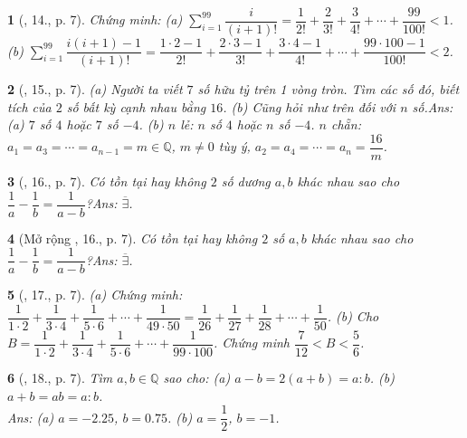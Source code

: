 \documentclass{article}
\newtheorem{baitoan}{}
\begin{document}
\begin{baitoan}[\cite{Binh_Toan_7_tap_1}, 14., p. 7]
	Chứng minh: (a) $\sum_{i=1}^{99} \dfrac{i}{(i+1)!} = \dfrac{1}{2!} + \dfrac{2}{3!} + \dfrac{3}{4!} + \cdots + \dfrac{99}{100!} < 1$. (b) $\sum_{i=1}^{99} \dfrac{i(i + 1) - 1}{(i+1)!} = \dfrac{1\cdot 2 - 1}{2!} + \dfrac{2\cdot 3 - 1}{3!} + \dfrac{3\cdot 4 - 1}{4!} + \cdots + \dfrac{99\cdot 100 - 1}{100!} < 2$.	
\end{baitoan}

\begin{baitoan}[\cite{Binh_Toan_7_tap_1}, 15., p. 7]
	(a) Người ta viết $7$ số hữu tỷ trên 1 vòng tròn. Tìm các số đó, biết tích của $2$ số bất kỳ cạnh nhau bằng $16$. (b) Cũng hỏi như trên đối với $n$ số.\hfill{\sf Ans: (a) $7$ số $4$ hoặc $7$ số $-4$. (b) $n$ lẻ: $n$ số $4$ hoặc $n$ số $-4$. $n$ chẵn: $a_1 = a_3 = \cdots = a_{n-1} = m\in\mathbb{Q}$, $m\ne 0$ tùy ý, $a_2 = a_4 = \cdots = a_n = \dfrac{16}{m}$.}
\end{baitoan}

\begin{baitoan}[\cite{Binh_Toan_7_tap_1}, 16., p. 7]
	Có tồn tại hay không $2$ số dương $a,b$ khác nhau sao cho $\dfrac{1}{a} - \dfrac{1}{b} = \dfrac{1}{a - b}$?\hfill{\sf Ans: $\overline{\exists}$.}
\end{baitoan}

\begin{baitoan}[Mở rộng \cite{Binh_Toan_7_tap_1}, 16., p. 7]
	Có tồn tại hay không $2$ số $a,b$ khác nhau sao cho $\dfrac{1}{a} - \dfrac{1}{b} = \dfrac{1}{a - b}$?\hfill{\sf Ans: $\overline{\exists}$.}
\end{baitoan}

\begin{baitoan}[\cite{Binh_Toan_7_tap_1}, 17., p. 7]
	(a) Chứng minh: $\dfrac{1}{1\cdot 2} + \dfrac{1}{3\cdot 4} + \dfrac{1}{5\cdot 6} + \cdots + \dfrac{1}{49\cdot 50} = \dfrac{1}{26} + \dfrac{1}{27} + \dfrac{1}{28} + \cdots + \dfrac{1}{50}$. (b) Cho $B = \dfrac{1}{1\cdot 2} + \dfrac{1}{3\cdot 4} + \dfrac{1}{5\cdot 6} + \cdots + \dfrac{1}{99\cdot 100}$. Chứng minh $\dfrac{7}{12} < B < \dfrac{5}{6}$.		
\end{baitoan}

\begin{baitoan}[\cite{Binh_Toan_7_tap_1}, 18., p. 7]
	Tìm $a,b\in\mathbb{Q}$ sao cho: (a) $a - b = 2(a + b) = a:b$. (b) $a + b = ab = a:b$.
	\\\mbox{}\hfill{\sf Ans: (a) $a = -2.25$, $b = 0.75$. (b) $a = \dfrac{1}{2}$, $b = -1$.}
\end{baitoan}
\end{document}
